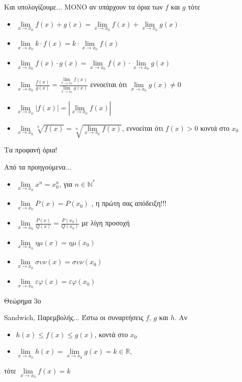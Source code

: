 \documentclass[greek]{beamer}
\begin{document}
\begin{frame}{Και υπολογίζουμε...}
  ΜΟΝΟ αν υπάρχουν τα όρια των $f$ και $g$ τότε
  \begin{itemize}
    \item $\lim\limits_{x \to x_0}{ f(x)+g(x) }=\lim\limits_{x \to x_0}{ f(x) }+\lim\limits_{x \to x_0}{ g(x) }$
    \item $\lim\limits_{x \to x_0}{ k\cdot f(x) }=k\cdot \lim\limits_{x \to x_0}{ f(x) }$
    \item $\lim\limits_{x \to x_0}{ f(x)\cdot g(x) }=\lim\limits_{x \to x_0}{ f(x) }\cdot\lim\limits_{x \to x_0}{ g(x) }$
    \item $\lim\limits_{x \to x_0}{ \frac{f(x)}{g(x)} }=\frac{\lim\limits_{x \to x_0}{ f(x) }}{\lim\limits_{x \to x_0}{ g(x) }}$ εννοείται ότι $\lim\limits_{x \to x_0}{ g(x) }\ne 0$
    \item $\lim\limits_{x \to x_0}{ |f(x)| }=|\lim\limits_{x \to x_0}{ f(x) }|$
    \item $\lim\limits_{x \to x_0}{ \sqrt[n]{f(x)} }=\sqrt[n]{\lim\limits_{x \to x_0}{ f(x) }}$, εννοείται ότι $f(x)>0$ κοντά στο $x_0$
  \end{itemize}
\end{frame}

\begin{frame}{Τα προφανή όρια!}
  \begin{block}{Από τα προηγούμενα...}
    \begin{itemize}
      \item $\lim\limits_{x \to x_0}{ x^n }=x_0^n$, για $n\in \mathbb{N}^*$ \pause
      \item $\lim\limits_{x \to x_0}{ P(x) }=P(x_0)$ \pause, η πρώτη σας απόδειξη!!! \pause
      \item $\lim\limits_{x \to x_0}{ \frac{P(x)}{Q(x)} }=\frac{P(x_0)}{Q(x_0)}$ \pause με λίγη προσοχή \pause
      \item $\lim\limits_{x \to x_0}{ ημ(x) }=ημ(x_0)$ \pause
      \item $\lim\limits_{x \to x_0}{ συν(x) }=συν(x_0)$ \pause
      \item $\lim\limits_{x \to x_0}{ εφ(x) }=εφ(x_0)$
    \end{itemize}
  \end{block}
\end{frame}

\begin{frame}{Θεώρημα 3ο}
  \begin{block}{Sandwich, Παρεμβολής...}
    Έστω οι συναρτήσεις $f$, $g$ και $h$. Αν
    \begin{itemize}
      \item $h(x)\le f(x) \le g(x)$, κοντά στο $x_0$ \pause
      \item $\lim\limits_{x \to x_0}{ h(x) }=\lim\limits_{x \to x_0}{ g(x) }=k \in\mathbb{R}$, \pause
    \end{itemize}
    τότε $\lim\limits_{x \to x_0}{ f(x) }=k$
  \end{block}
\end{frame}
\end{document}
